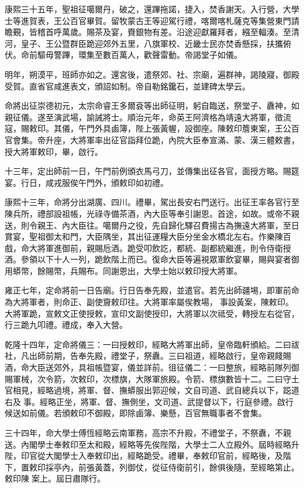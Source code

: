 \begin{pinyinscope}
康熙三十五年，聖祖征噶爾丹，破之，還蹕拖諾，捷入，焚香謝天。入行營，大學士等進賀表，王公百官畢賀。留牧蒙古王等迎駕行禮，喀爾喀札薩克等集營東門請瞻覲，皆稽首呼萬歲。賜茶及宴，賚銀物有差。沿途迎獻羅拜者，繦至輻湊。至清河，皇子、王公暨群臣跪迎郊外五里，八旗軍校、近畿士民亦焚香懸採，扶攜俯伏。命前驅毋警蹕，環集至數百萬人，歡聲雷動。帝謁堂子如儀。

明年，朔漠平，班師亦如之。還宮後，遣祭郊、社、宗廟，遍群神，謁陵寢，御殿受賀。直省官咸進表文，頒詔如制。帝自勒銘鑱石，並建碑太學云。

命將出征崇德初元，太宗命睿王多爾袞等出師征明，躬自臨送，祭堂子、纛神，如親征儀。遂至演武場，諭誡將士。順治元年，命英王阿濟格為靖遠大將軍，徵流寇，賜敕印。其儀，午門外具鹵簿，陛上張黃幄，設御座。陳敕印簷東案，王公百官會集。帝升座，大將軍率出征官詣拜位跪，內院大臣奉宣滿、蒙、漢三體敕書，授大將軍敕印，畢，啟行。

十三年，定出師前一日，午門前例頒衣馬弓刀，並傳集出征各官，面授方略。賜筵宴。行日，咸戎服俟午門外，頒敕印如初禮。

康熙十三年，命將分出湖廣、四川。禮畢，駕出長安右門送行。出征王率各官行至陳兵所，禮部設祖帳，光祿寺備茶酒，內大臣等奉引謝恩。首途，如故。或帝不親送，則令親王、內大臣往。噶爾丹之役，先自歸化驛召費揚古為撫遠大將軍，至日賞宴，聖祖御太和門，大臣隅坐，其出征運糧大臣分坐金水橋北左右。作樂陳百戲，命大將軍進御前，親賜卮酒。跪受叩飲訖，都統、副都統繼進，則令侍衛授酒。參領以下十人一列，跪飲階上而已。復命大臣等遍視眾軍飲宴畢，賜與宴者御用蟒幣，餘賜幣，兵賜布。同謝恩出，大學士始以敕印授大將軍。

雍正七年，定命將前一日告廟。行日告奉先殿，並遣官。若先出師疆埸，即軍前命為大將軍者，則命正、副使齎敕印往。大將軍率屬俟教場，事設黃案，陳敕印。大將軍跪，宣敕文正使授敕，宣印文副使授印，大將軍以次祗受，轉授左右從官，行三跪九叩禮。禮成，奉入大營。

乾隆十四年，定命將儀三：一曰授敕印，經略大將軍出師，皇帝臨軒頒給。二曰祓社，凡出師前期，告奉先殿，禮堂子，祭纛。三曰祖道，經略啟行，皇帝親餞賜酒，命大臣送郊外，具祖帳暨宴，儀並詳前。徂征儀二：一曰整旅，經略前隊列御賜軍械，次令箭，次敕印，次標旗，大隊軍旅殿。令箭、標旗數皆十二。二曰守土官相見，經略過境，將軍、督、撫蟒服出郭迎候，文自司道、武自總兵以下，跽道右及事。經略正坐，將軍、督、撫側坐，文司道、武提督以下，行庭參禮。啟行候送如前儀。若頒敕印不御殿，即除鹵簿、樂懸，百官無職事者不會集。

三十四年，命大學士傅恆經略云南軍務，高宗不升殿，不禮堂子，不祭纛，不親送。內閣學士奉敕印至太和殿，經略等先俟陛階，大學士二人立殿外。屆時經略升陛，印官從大閣學士入奉敕印出，經略跪受。禮畢，奉敕印官前，經略後，及階下，置敕印採亭內，前張黃蓋，列御仗，從征侍衛前引，餘俱後隨，至經略第止。敕印陳案上。屆日肅隊行。


\end{pinyinscope}
